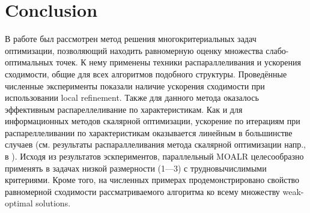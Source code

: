 \documentclass{llncs}
\begin{document}
\section{Conclusion}
В работе был рассмотрен метод решения многокритериальных задач оптимизации, позволяющий находить равномерную оценку множества слабо-оптимальных точек. К нему применены техники распараллеливания и ускорения сходимости, общие для всех алгоритмов подобного структуры. Проведённые численные эксперименты показали наличие ускорения сходимости при использовании local refinement. Также для данного метода оказалось эффективным распареллеливание по характеристикам. Как и для информационных методов скалярной оптимизации, ускорение по итерациям при распареллеливании по характеристикам оказывается линейным в большинстве случаев (см. результаты распараллеливания метода скалярной оптимизации напр., в \cite{barkalovLebedef2016}). Исходя из результатов эскпериментов, параллельный MOALR целесообразно применять в задачах низкой размерности (1---3) с трудновычислимыми критериями. Кроме того, на численных примерах продемонстрировано свойство равномерной сходимости рассматриваемого алгоритма ко всему множеству weak-optimal solutions.
%
%
%
%

%


\clearpage
{} %
\renewcommand{\indexname}{Author Index}
\printindex
\clearpage
\end{document}

